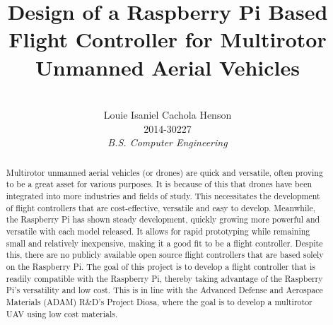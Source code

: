 \documentclass[english]{upeeei}
\begin{document}
\title{Design of a Raspberry Pi Based Flight Controller for Multirotor Unmanned Aerial Vehicles} 


\author{
\\Louie Isaniel Cachola Henson \\ 2014-30227 \\ \emph{B.S. Computer Engineering}
}




\maketitle
\begin{abstract} 



Multirotor unmanned aerial vehicles (or drones) are quick and versatile, often 
proving to be a great asset for various purposes. It is because of this that drones have been integrated into
more industries and fields of study. This necessitates the development of flight controllers that are
cost-effective, versatile and easy to develop. Meanwhile, the Raspberry Pi has shown steady development, quickly
growing more powerful and versatile with each model released. It allows for rapid prototyping while remaining
small and relatively inexpensive, making it a good fit to be a flight controller. Despite this, there are no
publicly available open source flight controllers that are based solely on the Raspberry Pi.
The goal of this project is to develop a flight controller that is readily compatible with the Raspberry Pi, 
thereby taking advantage of the Raspberry Pi's versatility and low cost. This is in line with the Advanced 
Defense and Aerospace Materials (ADAM) R\&D's Project Diosa, where the goal is to develop a multirotor UAV using 
low cost materials. 


\end{abstract}
\end{document}
